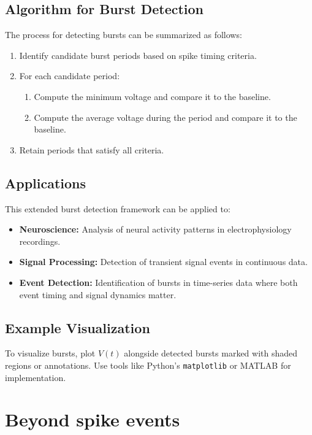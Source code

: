 \documentclass[a4paper,9pt]{extarticle}
\begin{document}
\subsection{Algorithm for Burst Detection}
The process for detecting bursts can be summarized as follows:
\begin{enumerate}
    \item Identify candidate burst periods based on spike timing criteria.
    \item For each candidate period:
    \begin{enumerate}
        \item Compute the minimum voltage and compare it to the baseline.
        \item Compute the average voltage during the period and compare it to the baseline.
    \end{enumerate}
    \item Retain periods that satisfy all criteria.
\end{enumerate}

\subsection{Applications}
This extended burst detection framework can be applied to:
\begin{itemize}
    \item \textbf{Neuroscience:} Analysis of neural activity patterns in electrophysiology recordings.
    \item \textbf{Signal Processing:} Detection of transient signal events in continuous data.
    \item \textbf{Event Detection:} Identification of bursts in time-series data where both event timing and signal dynamics matter.
\end{itemize}

\subsection{Example Visualization}
To visualize bursts, plot $V(t)$ alongside detected bursts marked with shaded regions or annotations. Use tools like Python's \texttt{matplotlib} or MATLAB for implementation.



\section{Beyond spike events}
\end{document}
